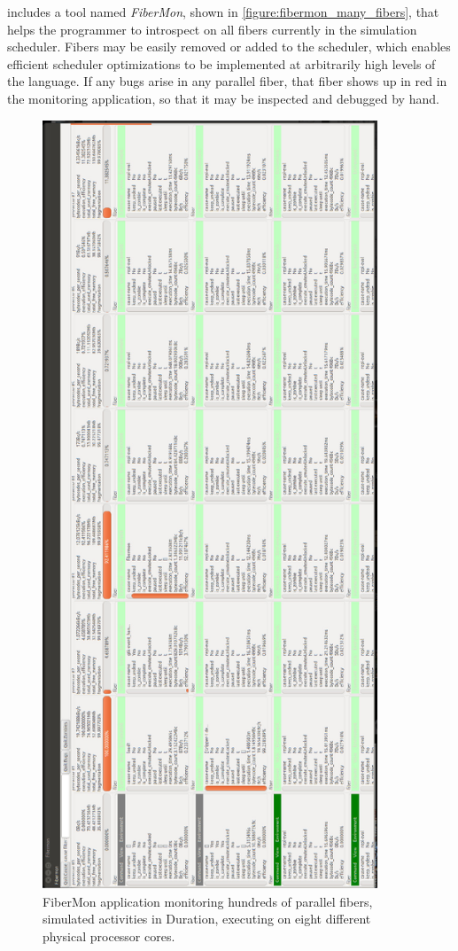 {\SALS} includes a tool named \emph{FiberMon}, shown in
\autoref{figure:fibermon_many_fibers}, that helps the programmer to
introspect on all fibers currently in the simulation scheduler.
Fibers may be easily removed or added to the scheduler, which enables
efficient scheduler optimizations to be implemented at arbitrarily
high levels of the language.  If any bugs arise in any parallel fiber,
that fiber shows up in red in the monitoring application, so that it
may be inspected and debugged by hand.
\begin{figure}[bth]
  \center
  \includegraphics[width=10cm]{gfx/fibermon_many_fibers}
  \caption[FiberMon application monitoring many fibers]{FiberMon
    application monitoring hundreds of parallel fibers, simulated
    activities in Duration, executing on eight different physical
    processor cores.}
  \label{figure:fibermon_many_fibers}
\end{figure}


